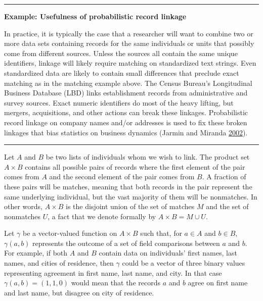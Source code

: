 \documentclass[]{krantz}
\begin{document}
\begin{center}\rule{0.5\linewidth}{\linethickness}\end{center}

\textbf{Example: Usefulness of probabilistic record linkage}

In practice, it is typically the case that a researcher will want to
combine two or more data sets containing records for the same
individuals or units that possibly come from different sources. Unless
the sources all contain the same unique identifiers, linkage will likely
require matching on standardized text strings. Even standardized data
are likely to contain small differences that preclude exact matching as
in the matching example above. The Census Bureau's Longitudinal Business
Database (LBD) links establishment records from administrative and
survey sources. Exact numeric identifiers do most of the heavy lifting,
but mergers, acquisitions, and other actions can break these linkages.
Probabilistic record linkage on company names and/or addresses is used
to fix these broken linkages that bias statistics on business dynamics
(Jarmin and Miranda
\protect\hyperlink{ref-jarmin2002longitudinal}{2002}).

\begin{center}\rule{0.5\linewidth}{\linethickness}\end{center}

Let \(A\) and \(B\) be two lists of individuals whom we wish to link.
The product set \(A \times B\) contains all possible pairs of records
where the first element of the pair comes from \(A\) and the second
element of the pair comes from \(B\). A fraction of these pairs will be
matches, meaning that both records in the pair represent the same
underlying individual, but the vast majority of them will be nonmatches.
In other words, \(A \times B\) is the disjoint union of the set of
matches \(M\) and the set of nonmatches \(U\), a fact that we denote
formally by \(A \times B = M \cup U\).

Let \(\gamma\) be a vector-valued function on \(A \times B\) such that,
for \(a \in A\) and \(b \in B\), \(\gamma(a, b)\) represents the outcome
of a set of field comparisons between \(a\) and \(b\). For example, if
both \(A\) and \(B\) contain data on individuals' first names, last
names, and cities of residence, then \(\gamma\) could be a vector of
three binary values representing agreement in first name, last name, and
city. In that case \(\gamma(a, b) = (1, 1, 0)\) would mean that the
records \(a\) and \(b\) agree on first name and last name, but disagree
on city of residence.
\end{document}
